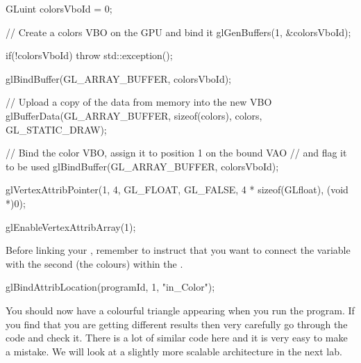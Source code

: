 \documentclass[10pt]{article}
\begin{document}
\begin{Code}
GLuint colorsVboId = 0;

// Create a colors VBO on the GPU and bind it
glGenBuffers(1, &colorsVboId);

if(!colorsVboId)
{
  throw std::exception();
}

glBindBuffer(GL_ARRAY_BUFFER, colorsVboId);

// Upload a copy of the data from memory into the new VBO
glBufferData(GL_ARRAY_BUFFER, sizeof(colors), colors, GL_STATIC_DRAW);

// Bind the color VBO, assign it to position 1 on the bound VAO
// and flag it to be used
glBindBuffer(GL_ARRAY_BUFFER, colorsVboId);

glVertexAttribPointer(1, 4, GL_FLOAT, GL_FALSE,
  4 * sizeof(GLfloat), (void *)0);

glEnableVertexAttribArray(1);
\end{Code}


Before linking your , remember to instruct
 that you want to connect the 
 variable with the second 
(the colours) within the .

\begin{Code}
glBindAttribLocation(programId, 1, "in_Color");
\end{Code}

You should now have a colourful triangle appearing when you run the
program. If you find that you are getting different results then very
carefully go through the code and check it. There is a lot of similar
code here and it is very easy to make a mistake.  We will look at a
slightly more scalable architecture in the next lab.

\end{document}
